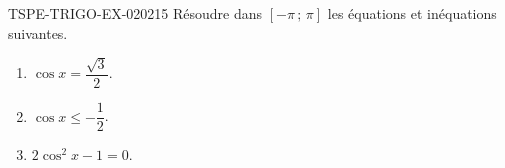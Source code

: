\begin{exercice}{TSPE-TRIGO-EX-020}{2}{15}
Résoudre dans $[-\pi\,;\,\pi]$ les équations et inéquations suivantes.
\begin{enumerate}
  \item $\cos x=\dfrac{\sqrt3}{2}$.
  \item $\cos x\leq-\dfrac12$.
  \item $2\cos^2x-1=0$.
\end{enumerate}
\end{exercice}
